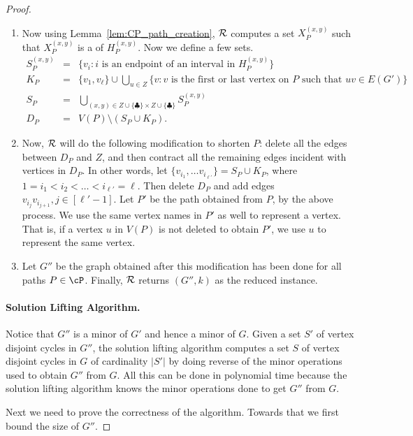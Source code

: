 \begin{proof}
\begin{enumerate}
\setlength{\itemsep}{-2pt}
\item Now using Lemma~\ref{lem:CP_path_creation},  ${\cal R}$ computes 
a set $X^{(x,y)}_P$ such that $X^{(x,y)}_P$ is a  of $H^{(x,y)}_P$. 
Now we define a few sets. 
\begin{eqnarray*}
S^{(x,y)}_P & = & \{v_i : i \mbox{ is an endpoint of an interval in } H^{(x,y)}_P \}\\
K_P& = & \{v_1,v_{\ell}\} \cup \bigcup_{u\in Z} \{ v : v \mbox{ is the first or last vertex on $P$ such that } uv\in E(G')\}\\ 
 S_P& = & \bigcup_{(x,y)\in  Z\cup \{\clubsuit\} \times Z \cup \{\clubsuit\}} S^{(x,y)}_P \\
 D_P & = & V(P)\setminus (S_P\cup K_P).
\end{eqnarray*}



\item Now, ${\cal R}$ will do the following modification to  shorten $P$: delete all the edges between 
$D_P$ and $Z$, and then contract all the remaining edges incident with vertices in $D_P$. In other words, let $\{v_{i_1},\ldots v_{i_{\ell'}}\}=S_P\cup K_P$, where $1=i_1<i_2<\ldots <i_{\ell'}=\ell$. Then delete $D_P$ and add edges $v_{i_j}v_{i_{j+1}}, j\in [\ell'-1]$. 
Let $P'$ be the path obtained from $P$, by the above process. We use the same vertex names in $P'$ as well to represent a
vertex. That is, if a vertex $u$ in $V(P)$ is not deleted to obtain $P'$, we use $u$ to represent the same vertex. 
\item Let $G''$ be the graph obtained after this modification has been done for all paths $P\in \cP$. 
Finally,  ${\cal R}$ returns $(G'',k)$ as the reduced instance. 
\end{enumerate}
\paragraph{Solution Lifting Algorithm.} 
Notice that $G''$ is a minor of $G'$ and hence a minor of $G$.  Given a set $S'$ of vertex disjoint cycles in 
$G''$, the solution lifting algorithm computes a set $S$ of vertex disjoint cycles in $G$ of cardinality 
$\vert S'\vert$ by doing reverse of the minor operations used to obtain $G''$ from $G$. All this can be done in polynomial time because  the solution lifting algorithm knows the 
minor operations done to get $G''$ from $G$.    

Next we need to prove the correctness of the algorithm. Towards that we first bound the size of $G''$.  


\end{proof}
